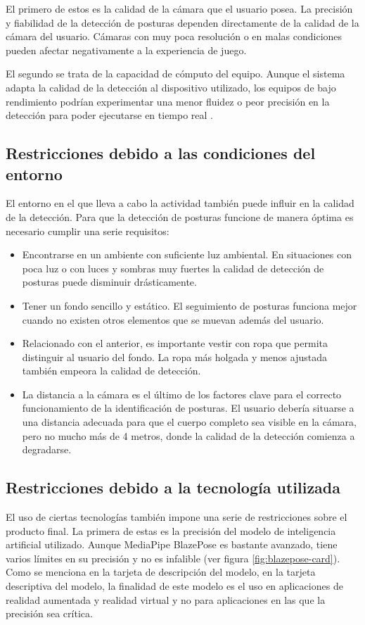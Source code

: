 El primero de estos es la calidad de la cámara que el usuario posea. La precisión y fiabilidad de
la detección de posturas dependen directamente de la calidad de la cámara del usuario. Cámaras con
muy poca resolución o en malas condiciones pueden afectar negativamente a la experiencia de juego.

El segundo se trata de la capacidad de cómputo del equipo. Aunque el sistema adapta la calidad de
la detección al dispositivo utilizado, los equipos de bajo rendimiento podrían experimentar una
menor fluidez o peor precisión en la detección para poder ejecutarse en tiempo real
\parencites{bazarevsky2020blazepose}{MediaPipeMirror}.

\subsection{Restricciones debido a las condiciones del entorno}
El entorno en el que lleva a cabo la actividad también puede influir en la
calidad de la detección.  Para que la detección de posturas funcione de manera
óptima es necesario cumplir una serie requisitos:
\begin{itemize}
    \item Encontrarse en un ambiente con suficiente luz ambiental. En
    situaciones con poca luz o con luces y sombras muy fuertes la calidad de
    detección de posturas puede disminuir drásticamente.

    \item Tener un fondo sencillo y estático. El seguimiento de posturas
    funciona mejor cuando no existen otros elementos que se muevan además del
    usuario.

    \item Relacionado con el anterior, es importante vestir con ropa que permita
    distinguir al usuario del fondo. La ropa más holgada y menos ajustada
    también empeora la calidad de detección.

    \item La distancia a la cámara es el último de los factores clave para el
    correcto funcionamiento de la identificación de posturas. El usuario debería
    situarse a una distancia adecuada para que el cuerpo completo sea visible en
    la cámara, pero no mucho más de 4 metros, donde la calidad de la detección
    comienza a degradarse.
\end{itemize}

\subsection{Restricciones debido a la tecnología utilizada}
El uso de ciertas tecnologías también impone una serie de restricciones sobre el
producto final.  La primera de estas es la precisión del modelo de inteligencia
artificial utilizado. Aunque MediaPipe BlazePose es bastante avanzado, tiene
varios límites en su precisión y no es infalible (ver figura
\ref{fig:blazepose-card}).  Como se menciona en la tarjeta de descripción del
modelo, en la tarjeta descriptiva del modelo\footnotemark, la finalidad de este
modelo es el uso en aplicaciones de realidad aumentada y realidad virtual y no
para aplicaciones en las que la precisión sea crítica.


